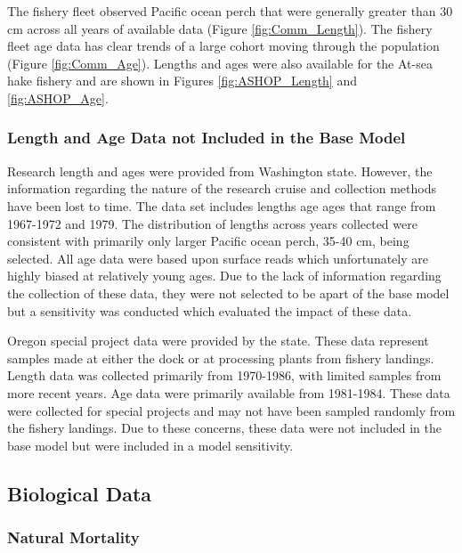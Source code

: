 \documentclass[12pt,]{article}
\begin{document}
The fishery fleet observed Pacific ocean perch that were generally
greater than 30 cm across all years of available data (Figure
\ref{fig:Comm_Length}). The fishery fleet age data has clear trends of a
large cohort moving through the population (Figure \ref{fig:Comm_Age}).
Lengths and ages were also available for the At-sea hake fishery and are
shown in Figures \ref{fig:ASHOP_Length} and \ref{fig:ASHOP_Age}.

\subsubsection{Length and Age Data not Included in the Base
Model}\label{length-and-age-data-not-included-in-the-base-model}

Research length and ages were provided from Washington state. However,
the information regarding the nature of the research cruise and
collection methods have been lost to time. The data set includes lengths
age ages that range from 1967-1972 and 1979. The distribution of lengths
across years collected were consistent with primarily only larger
Pacific ocean perch, 35-40 cm, being selected. All age data were based
upon surface reads which unfortunately are highly biased at relatively
young ages. Due to the lack of information regarding the collection of
these data, they were not selected to be apart of the base model but a
sensitivity was conducted which evaluated the impact of these data.

Oregon special project data were provided by the state. These data
represent samples made at either the dock or at processing plants from
fishery landings. Length data was collected primarily from 1970-1986,
with limited samples from more recent years. Age data were primarily
available from 1981-1984. These data were collected for special projects
and may not have been sampled randomly from the fishery landings. Due to
these concerns, these data were not included in the base model but were
included in a model sensitivity.

\subsection{Biological Data}\label{biological-data}

\subsubsection{Natural Mortality}\label{natural-mortality}
\end{document}
